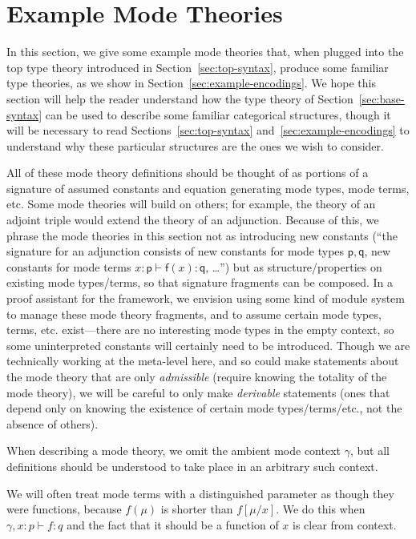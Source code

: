 \documentclass[10pt]{article}
\theoremstyle{definition}
\newcommand{\yields}{\vdash}
\begin{document}
\section{Example Mode Theories}
\label{sec:mode-examples}

In this section, we give some example mode theories that, when plugged
into the top type theory introduced in Section~\ref{sec:top-syntax},
produce some familiar type theories, as we show in
Section~\ref{sec:example-encodings}.  We hope this section will help the
reader understand how the type theory of Section~\ref{sec:base-syntax}
can be used to describe some familiar categorical structures, though it
will be necessary to read Sections~\ref{sec:top-syntax}
and~\ref{sec:example-encodings} to understand why these particular
structures are the ones we wish to consider.

All of these mode theory definitions should be thought of as portions of
a signature of assumed constants and equation generating mode types,
mode terms, etc.  Some mode theories will build on others; for example,
the theory of an adjoint triple would extend the theory of an
adjunction.  Because of this, we phrase the mode theories in this
section not as introducing new constants (``the signature for an
adjunction consists of new constants for mode types $\mathsf{p},
\mathsf{q}$, new constants for mode terms $x : \mathsf{p} \vdash
\mathsf{f}(x) : \mathsf{q}$, \ldots'') but as structure/properties on
existing mode types/terms, so that signature fragments can be composed.
In a proof assistant for the framework, we envision using some kind of
module system to manage these mode theory fragments, and to assume
certain mode types, terms, etc. exist---there are no
interesting mode types in the empty context, so some
uninterpreted constants will certainly need to be introduced.  Though we are
technically working at the meta-level here, and so could make statements
about the mode theory that are only \emph{admissible} (require knowing
the totality of the mode theory), we will be careful to only make
\emph{derivable} statements (ones that depend only on knowing the
existence of certain mode types/terms/etc., not the absence of others).

When describing a mode theory, we omit the ambient mode context
$\gamma$, but all definitions should be understood to take place in an
arbitrary such context.

We will often treat mode terms with a distinguished parameter as though
they were functions, because $f(\mu)$ is shorter than $f[\mu/x]$.  We do
this when $\gamma, x : p \yields f : q$ and the fact that it should be a
function of $x$ is clear from context.
\end{document}
